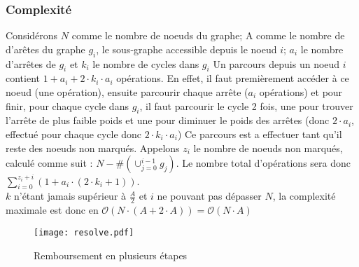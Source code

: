\documentclass[12pt, oneside]{article}
\begin{document}
\subsubsection{Complexité}
Considérons $N$ comme le nombre de noeuds du graphe; A comme le nombre de d'arêtes du graphe $g_{i}$, le sous-graphe accessible depuis le noeud $i$; $a_{i}$ le nombre d'arrêtes de $g_{i}$ et $k_{i}$ le nombre de cycles dans $g_{i}$
Un parcours depuis un noeud $i$ contient $1 + a_{i} + 2\cdot k_{i} \cdot a_{i}$ opérations. En effet, il faut premièrement accéder à ce noeud (une opération), ensuite parcourir chaque arrête ($a_{i}$ opérations) et pour finir, pour chaque cycle dans $g_{i}$, il faut parcourir le cycle 2 fois, une pour trouver l'arrête de plus faible poids et une pour diminuer le poids des arrêtes (donc $2 \cdot a_{i} $, effectué pour chaque cycle donc $2\cdot k_{i} \cdot a_{i}$)
Ce parcours est a effectuer tant qu'il reste des noeuds non marqués. Appelons $z_{i}$ le nombre de noeuds non marqués, calculé comme suit : $N-\#(\cup_{j=0}^{i-1} g_{j})$.
Le nombre total d'opérations sera donc $\sum_{i=0}^{z_{i}+i}(1 + a_{i} \cdot(2\cdot k_{i} +1))$.\\
$k$ n'étant jamais supérieur à $\frac{A}{2}$ et $i$ ne pouvant pas dépasser $N$, la complexité maximale est donc en $\mathcal{O}(N\cdot (A + 2\cdot A)) = \mathcal{O}(N\cdot A)$
\begin{figure}[h]
\caption{\label{resolve} Remboursement en plusieurs étapes}
\center
\texttt{[image: resolve.pdf]}
\end{figure}
\end{document}
